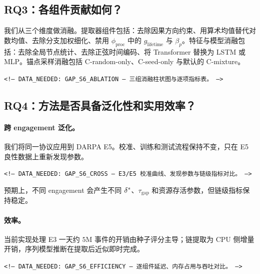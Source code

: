 \subsection{RQ3：各组件贡献如何？}

我们从三个维度做消融。提取器组件包括：去除因果方向约束、用算术均值替代对数均值、去除分支加权细化、禁用 $\phi_{\text{proc}}$ 中的 $g_{\text{lifetime}}$ 与 $\beta_p$。特征与模型消融包括：去除全局节点统计、去除正弦时间编码、将 Transformer 替换为 LSTM 或 MLP。锚点采样消融包括 C-random-only、C-seed-only 与默认的 C-mixture。
\begin{flushleft}\small\texttt{<!-- DATA\_NEEDED: GAP\_S6\_ABLATION --- 三组消融柱状图与逐项指标表。 -->}\end{flushleft}

\subsection{RQ4：方法是否具备泛化性和实用效率？}

\paragraph{跨 engagement 泛化。}我们将同一协议应用到 DARPA E5。校准、训练和测试流程保持不变，只在 E5 良性数据上重新发现参数。
\begin{flushleft}\small\texttt{<!-- DATA\_NEEDED: GAP\_S6\_CROSS --- E3/E5 校准曲线、发现参数与链级指标对比。 -->}\end{flushleft}
预期上，不同 engagement 会产生不同 $\delta^*$、$\tau_{\text{gap}}$ 和资源存活参数，但链级指标保持稳定。

\paragraph{效率。}当前实现处理 E3 一天约 $5$M 事件的开销由种子评分主导；链提取为 CPU 侧增量开销，序列模型推断在提取后近似即时完成。
\begin{flushleft}\small\texttt{<!-- DATA\_NEEDED: GAP\_S6\_EFFICIENCY --- 逐组件延迟、内存占用与吞吐对比。 -->}\end{flushleft}
